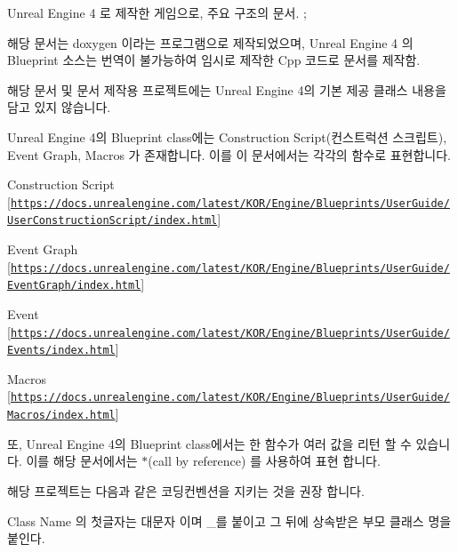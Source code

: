 Unreal Engine 4 로 제작한 게임으로, 주요 구조의 문서. ;

해당 문서는 \textquotesingle{}doxygen\textquotesingle{} 이라는 프로그램으로 제작되었으며, Unreal Engine 4 의 Blueprint 소스는 번역이 불가능하여 임시로 제작한 Cpp 코드로 문서를 제작함.

해당 문서 및 문서 제작용 프로젝트에는 Unreal Engine 4의 기본 제공 클래스 내용을 담고 있지 않습니다.

Unreal Engine 4의 Blueprint class에는 Construction Script(컨스트럭션 스크립트), Event Graph, Macros 가 존재합니다. 이를 이 문서에서는 각각의 함수로 표현합니다.


\begin{DoxyItemize}
\item Construction Script \mbox{[}\href{https://docs.unrealengine.com/latest/KOR/Engine/Blueprints/UserGuide/UserConstructionScript/index.html}{\tt https\+://docs.\+unrealengine.\+com/latest/\+K\+O\+R/\+Engine/\+Blueprints/\+User\+Guide/\+User\+Construction\+Script/index.\+html}\mbox{]}
\item Event Graph \mbox{[}\href{https://docs.unrealengine.com/latest/KOR/Engine/Blueprints/UserGuide/EventGraph/index.html}{\tt https\+://docs.\+unrealengine.\+com/latest/\+K\+O\+R/\+Engine/\+Blueprints/\+User\+Guide/\+Event\+Graph/index.\+html}\mbox{]}
\item Event \mbox{[}\href{https://docs.unrealengine.com/latest/KOR/Engine/Blueprints/UserGuide/Events/index.html}{\tt https\+://docs.\+unrealengine.\+com/latest/\+K\+O\+R/\+Engine/\+Blueprints/\+User\+Guide/\+Events/index.\+html}\mbox{]}
\item Macros \mbox{[}\href{https://docs.unrealengine.com/latest/KOR/Engine/Blueprints/UserGuide/Macros/index.html}{\tt https\+://docs.\+unrealengine.\+com/latest/\+K\+O\+R/\+Engine/\+Blueprints/\+User\+Guide/\+Macros/index.\+html}\mbox{]}
\end{DoxyItemize}

또, Unreal Engine 4의 Blueprint class에서는 한 함수가 여러 값을 리턴 할 수 있습니다. 이를 해당 문서에서는 \textquotesingle{}$\ast$\textquotesingle{}(call by reference) 를 사용하여 표현 합니다.

해당 프로젝트는 다음과 같은 코딩컨벤션을 지키는 것을 권장 합니다.


\begin{DoxyItemize}
\item Class Name 의 첫글자는 대문자 이며 \textquotesingle{}\+\_\+\textquotesingle{}를 붙이고 그 뒤에 상속받은 부모 클래스 명을 붙인다.
\item 
\item 
\end{DoxyItemize}